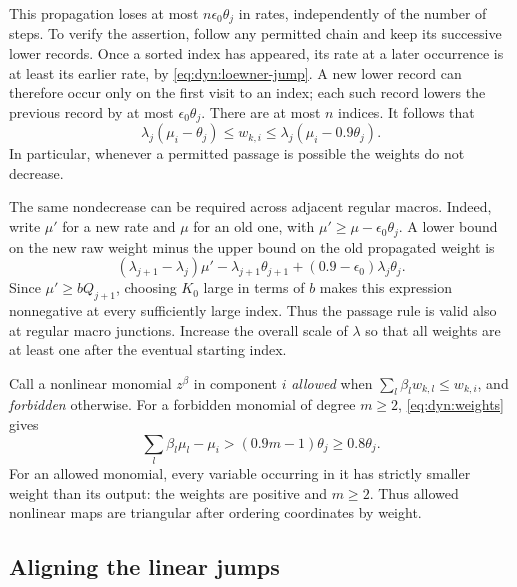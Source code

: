 \documentclass[11pt]{article}
\theoremstyle{definition}
\theoremstyle{remark}
\numberwithin{equation}{section}
\begin{document}
This propagation loses at most $n\epsilon_0\theta_j$ in rates,
independently of the number of steps.  To verify the assertion, follow
any permitted chain and keep its successive lower records.  Once a
sorted index has appeared, its rate at a later occurrence is at least
its earlier rate, by \eqref{eq:dyn:loewner-jump}.  A new lower record
can therefore occur only on the first visit to an index; each such
record lowers the previous record by at most
$\epsilon_0\theta_j$.  There are at most $n$ indices.  It follows that
\begin{equation}
 \lambda_j(\mu_i-\theta_j)\le w_{k,i}
 \le\lambda_j(\mu_i-0.9\theta_j).
 \label{eq:dyn:weights}
\end{equation}
In particular, whenever a permitted passage is possible the weights
do not decrease.

The same nondecrease can be required across adjacent regular macros.
Indeed, write $\mu'$ for a new rate and $\mu$ for an old one, with
$\mu'\ge\mu-\epsilon_0\theta_j$.  A lower bound on the new raw weight
minus the upper bound on the old propagated weight is
\[
 (\lambda_{j+1}-\lambda_j)\mu'
 -\lambda_{j+1}\theta_{j+1}
 +(0.9-\epsilon_0)\lambda_j\theta_j.
\]
Since $\mu'\ge bQ_{j+1}$, choosing $K_0$ large in terms of $b$ makes
this expression nonnegative at every sufficiently large index.
Thus the passage rule is valid also at regular macro junctions.
Increase the overall scale of $\lambda$ so that all weights are at
least one after the eventual starting index.

Call a nonlinear monomial $z^\beta$ in component $i$ \emph{allowed}
when $\sum_l\beta_lw_{k,l}\le w_{k,i}$, and \emph{forbidden} otherwise.
For a forbidden monomial of degree $m\ge2$,
\eqref{eq:dyn:weights} gives
\begin{equation}
 \sum_l\beta_l\mu_l-\mu_i
 >(0.9m-1)\theta_j\ge0.8\theta_j.
 \label{eq:dyn:forbidden-gap}
\end{equation}
For an allowed monomial, every variable occurring in it has strictly
smaller weight than its output: the weights are positive and $m\ge2$.
Thus allowed nonlinear maps are triangular after ordering coordinates
by weight.

\subsection{Aligning the linear jumps}
\end{document}
